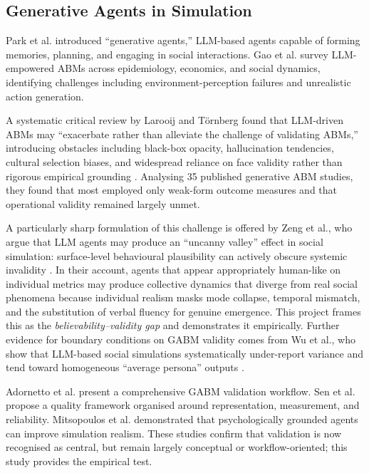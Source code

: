 \documentclass[11pt]{article}
\begin{document}
\subsection{Generative Agents in Simulation}
Park et al. \cite{park2023generative} introduced ``generative agents,'' LLM-based agents capable of forming memories, planning, and engaging in social interactions. Gao et al. \cite{gao2024survey} survey LLM-empowered ABMs across epidemiology, economics, and social dynamics, identifying challenges including environment-perception failures and unrealistic action generation.

A systematic critical review by Larooij and T\"{o}rnberg found that LLM-driven ABMs may ``exacerbate rather than alleviate the challenge of validating ABMs,'' introducing obstacles including black-box opacity, hallucination tendencies, cultural selection biases, and widespread reliance on face validity rather than rigorous empirical grounding \cite{larooij2025critical}. Analysing 35 published generative ABM studies, they found that most employed only weak-form outcome measures and that operational validity remained largely unmet.

A particularly sharp formulation of this challenge is offered by Zeng et al., who argue that LLM agents may produce an ``uncanny valley'' effect in social simulation: surface-level behavioural plausibility can actively obscure systemic invalidity \cite{zeng2026uncanny}. In their account, agents that appear appropriately human-like on individual metrics may produce collective dynamics that diverge from real social phenomena because individual realism masks mode collapse, temporal mismatch, and the substitution of verbal fluency for genuine emergence. This project frames this as the \emph{believability--validity gap} and demonstrates it empirically. Further evidence for boundary conditions on GABM validity comes from Wu et al., who show that LLM-based social simulations systematically under-report variance and tend toward homogeneous ``average persona'' outputs \cite{wu2026boundary}.

Adornetto et al. \cite{adornetto2025overview} present a comprehensive GABM validation workflow. Sen et al. \cite{sen2025validating} propose a quality framework organised around representation, measurement, and reliability. Mitsopoulos et al. \cite{mitsopoulos2023psychologically} demonstrated that psychologically grounded agents can improve simulation realism. These studies confirm that validation is now recognised as central, but remain largely conceptual or workflow-oriented; this study provides the empirical test.
\end{document}
